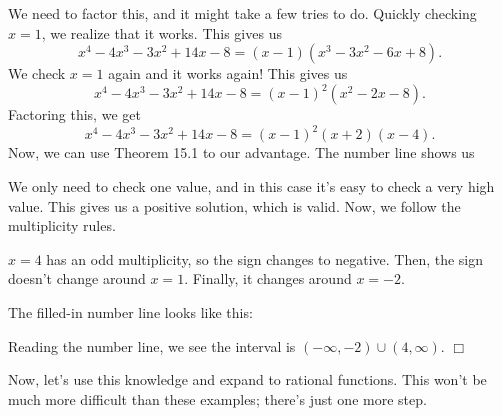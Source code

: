\documentclass[lang=en,11pt]{elegantbook}
\begin{document}
\begin{solution}
We need to factor this, and it might take a few tries to do.  Quickly checking $x=1$, we realize that it works.  This gives us $$x^4-4x^3-3x^2+14x-8=(x-1)(x^3-3x^2-6x+8).$$ We check $x=1$ again and it works again!  This gives us $$x^4-4x^3-3x^2+14x-8=(x-1)^2(x^2-2x-8).$$ Factoring this, we get $$x^4-4x^3-3x^2+14x-8=(x-1)^2(x+2)(x-4).$$  Now, we can use Theorem 15.1 to our advantage.  The number line shows us 
\begin{figure}[!h]
    \centering
\end{figure}

We only need to check one value, and in this case it's easy to check a very high value.  This gives us a positive solution, which is valid.  Now, we follow the multiplicity rules.

$x=4$ has an odd multiplicity, so the sign changes to negative.  Then, the sign doesn't change around $x=1$.  Finally, it changes around $x=-2$.  

The filled-in number line looks like this:
\begin{figure}[!h]
    \centering
\end{figure}

Reading the number line, we see the interval is $(-\infty,-2)\cup(4,\infty)$. $\Box$
\end{solution}
Now, let's use this knowledge and expand to rational functions.  This won't be much more difficult than these examples; there's just one more step.
\end{document}
